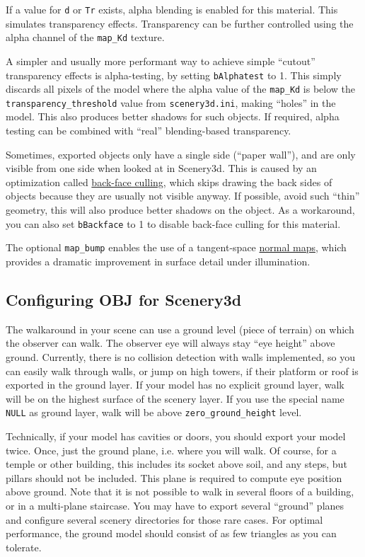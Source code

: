 \documentclass[a4paper]{article}
\newcommand{\filename}[1]{\texttt{#1}}
\newcommand{\cmd}[1]{\texttt{#1}}
\begin{document}
If a value for \cmd{d} or \cmd{Tr} exists, alpha blending is enabled for this
material. This simulates transparency effects. Transparency can be further
controlled using the alpha channel of the \cmd{map\_Kd} texture.

A simpler and usually more performant way to achieve simple ``cutout''
transparency effects is alpha-testing, by setting \cmd{bAlphatest} to 1. This
simply discards all pixels of the model where the alpha value of the
\cmd{map\_Kd} is below the \cmd{transparency\_threshold} value from
\filename{scenery3d.ini}, making ``holes'' in the model. This also produces
better shadows for such objects. If required, alpha testing can be combined with
``real'' blending-based transparency.

Sometimes, exported objects only have a single side (``paper wall''), and are only visible
from one side when looked at in Scenery3d. This is caused by an optimization
called \href{https://en.wikipedia.org/wiki/Back-face_culling}{back-face
culling}, which skips drawing the back sides of objects because they are usually
not visible anyway. If possible, avoid such ``thin'' geometry, this will also
produce better shadows on the object. As a workaround, you can also set
\cmd{bBackface} to 1 to disable back-face culling for this material.

The optional \cmd{map\_bump} enables the use of a tangent-space
\href{https://en.wikipedia.org/wiki/Normal_mapping}{normal maps}, which provides
a dramatic improvement in surface detail under illumination.

\subsection{Configuring OBJ for Scenery3d}
\label{sec:Configuring}

The walkaround in your scene can use a ground level (piece of terrain)
on which the observer can walk. The observer eye will always stay ``eye
height'' above ground. Currently, there is no collision detection with
walls implemented, so you can easily walk through walls, or jump on
high towers, if their platform or roof is exported in the ground
layer. If your model has no explicit ground layer, walk will be on the
highest surface of the scenery layer.  If you use the special name
\texttt{NULL} as ground layer, walk will be above \texttt{zero\_ground\_height} level.

Technically, if your model has cavities or doors, you should export
your model twice. Once, just the ground plane, i.e. where you will
walk. Of course, for a temple or other building, this includes its
socket above soil, and any steps, but pillars should not be included.  
This plane is required to compute
eye position above ground. Note that it is not possible to walk in
several floors of a building, or in a multi-plane staircase. You may
have to export several ``ground'' planes and configure several scenery
directories for those rare cases. For optimal performance, the ground 
model should consist of as few triangles as you can tolerate.
\end{document}
